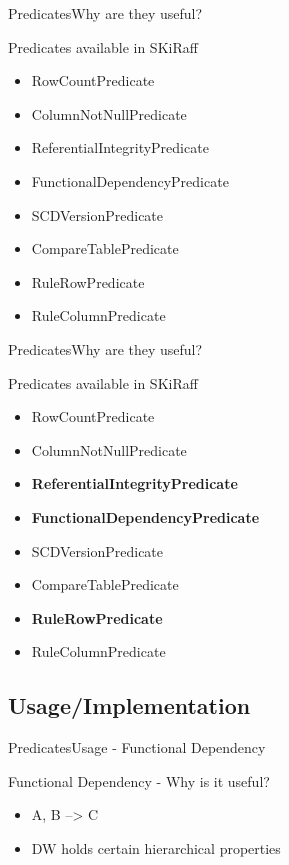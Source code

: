 \begin{frame}{Predicates}{Why are they useful?}
	\begin{block}{Predicates available in SKiRaff}
		\begin{itemize}
			\item<1-> RowCountPredicate
			\item<1-> ColumnNotNullPredicate
			\item<1-> ReferentialIntegrityPredicate
			\item<1-> FunctionalDependencyPredicate
			\item<1-> SCDVersionPredicate
			\item<1-> CompareTablePredicate
			\item<1-> RuleRowPredicate
			\item<1-> RuleColumnPredicate
		\end{itemize}
	\end{block}
\end{frame}

\begin{frame}{Predicates}{Why are they useful?}
	\begin{block}{Predicates available in SKiRaff}
		\begin{itemize}
			\item<1-> RowCountPredicate
			\item<1-> ColumnNotNullPredicate
			\item<1-> \textbf{ReferentialIntegrityPredicate}
			\item<1-> \textbf{FunctionalDependencyPredicate}
			\item<1-> SCDVersionPredicate
			\item<1-> CompareTablePredicate
			\item<1-> \textbf{RuleRowPredicate}
			\item<1-> RuleColumnPredicate
		\end{itemize}
	\end{block}
\end{frame}

\subsection{Usage/Implementation }
\begin{frame}{Predicates}{Usage - Functional Dependency}
	\begin{block}{Functional Dependency - Why is it useful?}
		\begin{itemize}
			\item<1-> A, B --> C
			\item<2-> DW holds certain hierarchical properties
		\end{itemize}
	\end{block}
\end{frame}

